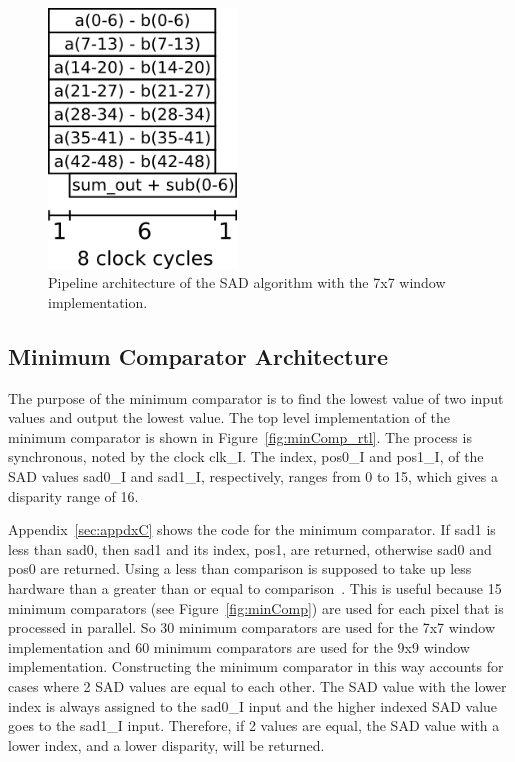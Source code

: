 \begin{figure}[h]
	\begin{center}
		\includegraphics[width=50mm]{figures/sadPipeline7x7.png}
		\captionfonts
		\caption{Pipeline architecture of the SAD algorithm with the 7x7 window implementation.}
		\label{fig:sadPipe7x7}
	\end{center}
\end{figure}

\subsection{Minimum Comparator Architecture}

The purpose of the minimum comparator is to find the lowest value of two input values and output the lowest value. The top level implementation of the minimum comparator is shown in Figure~\ref{fig:minComp_rtl}. The process is synchronous, noted by the clock clk\_I. The index, pos0\_I and pos1\_I, of the SAD values sad0\_I and sad1\_I, respectively, ranges from 0 to 15, which gives a disparity range of 16. 

Appendix~\ref{sec:appdxC} shows the code for the minimum comparator. If sad1 is less than sad0, then sad1 and its index, pos1, are returned, otherwise sad0 and pos0 are returned. Using a less than comparison is supposed to take up less hardware than a greater than or equal to comparison~\cite{lessThan}. This is useful because 15 minimum comparators (see Figure~\ref{fig:minComp}) are used for each pixel that is processed in parallel. So 30 minimum comparators are used for the 7x7 window implementation and 60 minimum comparators are used for the 9x9 window implementation. Constructing the minimum comparator in this way accounts for cases where 2 SAD values are equal to each other. The SAD value with the lower index is always assigned to the sad0\_I input and the higher indexed SAD value goes to the sad1\_I input. Therefore, if 2 values are equal, the SAD value with a lower index, and a lower disparity, will be returned. %

